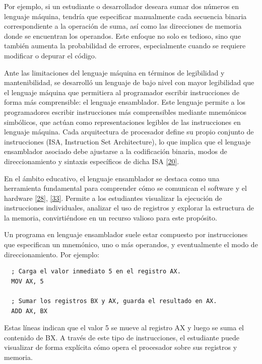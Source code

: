 \documentclass[12pt,oneside]{templates/unerthesis}
\begin{document}
Por ejemplo, si un estudiante o desarrollador deseara sumar dos números en lenguaje máquina, tendría que especificar manualmente cada secuencia binaria correspondiente a la operación de suma, así como las direcciones de memoria donde se encuentran los operandos. Este enfoque no solo es tedioso, sino que también aumenta la probabilidad de errores, especialmente cuando se requiere modificar o depurar el código.

Ante las limitaciones del lenguaje máquina en términos de legibilidad y mantenibilidad, se desarrolló un lenguaje de bajo nivel con mayor legibilidad que el lenguaje máquina que permitiera al programador escribir instrucciones de forma más comprensible: el lenguaje ensamblador. Este lenguaje permite a los programadores escribir instrucciones más comprensibles mediante mnemónicos simbólicos, que actúan como representaciones legibles de las instrucciones en lenguaje máquina. Cada arquitectura de procesador define su propio conjunto de instrucciones (ISA, Instruction Set Architecture), lo que implica que el lenguaje ensamblador asociado debe ajustarse a la codificación binaria, modos de direccionamiento y sintaxis específicos de dicha ISA \protect\hyperlink{ref-stallings_computer_2021}{{[}20{]}}.

En el ámbito educativo, el lenguaje ensamblador se destaca como una herramienta fundamental para comprender cómo se comunican el software y el hardware \protect\hyperlink{ref-tanenbaum_structured_2016}{{[}28{]}}, \protect\hyperlink{ref-null_essentials_2023}{{[}33{]}}. Permite a los estudiantes visualizar la ejecución de instrucciones individuales, analizar el uso de registros y explorar la estructura de la memoria, convirtiéndose en un recurso valioso para este propósito.

Un programa en lenguaje ensamblador suele estar compuesto por instrucciones que especifican un mnemónico, uno o más operandos, y eventualmente el modo de direccionamiento. Por ejemplo:

\begin{lstlisting}
  ; Carga el valor inmediato 5 en el registro AX.
  MOV AX, 5  

  ; Sumar los registros BX y AX, guarda el resultado en AX.
  ADD AX, BX 
  \end{lstlisting}

Estas líneas indican que el valor 5 se mueve al registro AX y luego se suma el contenido de BX. A través de este tipo de instrucciones, el estudiante puede visualizar de forma explícita cómo opera el procesador sobre sus registros y memoria.
\end{document}
